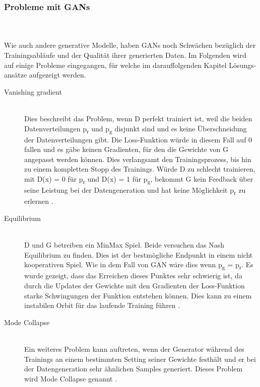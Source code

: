 \documentclass{llncs}
\begin{document}
\subsubsection{Probleme mit GANs}\label{sec:problemegan}
~\\\\
Wie auch andere generative Modelle, haben GANs noch Schwächen bezüglich der Trainingsabläufe und der Qualität ihrer generierten Daten. Im Folgenden wird auf einige Probleme eingegangen, für welche im darauffolgenden Kapitel Lösungs-ansätze aufgezeigt werden. 
\\
\begin{description}	
\item[Vanishing gradient]
~\\
Dies beschreibt das Problem, wenn D perfekt trainiert ist, weil die beiden Datenverteilungen p\textsubscript{r} und  p\textsubscript{g} disjunkt sind und es keine Überschneidung der Datenverteilungen gibt.  Die Loss-Funktion würde in diesem Fall auf 0 fallen und es gäbe keinen Gradienten, für den die Gewichte von G angepasst werden können. Dies verlangsamt den Trainingsprozess, bis hin zu einem kompletten Stopp des Trainings. Würde D zu schlecht trainieren, mit D(x) = 0 für p\textsubscript{r} und  D(x) = 1 für p\textsubscript{g}, bekommt G kein Feedback über seine Leistung bei der Datengeneration und hat keine Möglichkeit p\textsubscript{r} zu erlernen \cite{vanishing}.
\\
\item[Equilibrium]
~\\
D und G betreiben ein MinMax Spiel. Beide versuchen das Nash Equilibrium zu finden. Dies ist der bestmögliche Endpunkt in einem nicht kooperativen Spiel. Wie in dem Fall von GAN wäre dies wenn  p\textsubscript{g} = p\textsubscript{r}. Es wurde gezeigt, dass das Erreichen dieses Punktes sehr schwierig ist, da durch die Updates der Gewichte mit den Gradienten der Loss-Funktion starke Schwingungen der Funktion entstehen können. Dies kann zu einem instabilen Orbit für das laufende Training führen \cite{improvingan}.   
\\
\item[Mode Collapse]
~\\
Ein weiteres Problem kann auftreten, wenn der Generator während des Trainings an einem bestimmten Setting seiner Gewichte festhält und er bei der Datengeneration sehr ähnlichen Samples generiert. Dieses Problem wird Mode Collapse genannt \cite{improvingan}.
\end{description}
\end{document}
